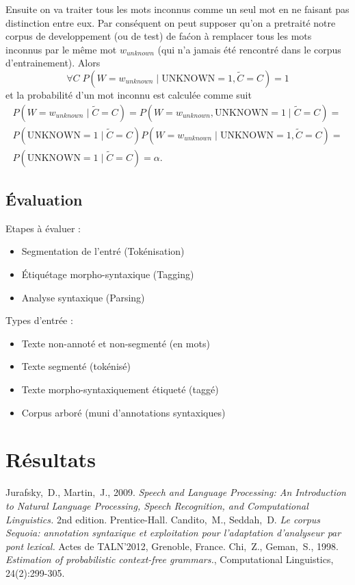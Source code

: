 \documentclass[12pt]{article}
\begin{document}
Ensuite on va traiter tous les mots inconnus comme un seul mot en ne faisant pas distinction entre eux. 
Par cons\'equent on peut supposer qu'on a pretrait\'e notre corpus de developpement (ou de test) de fa\'con \`a remplacer tous les mots inconnus par le m\^eme mot $w_{unknown}$ (qui n'a jamais \'et\'e rencontr\'e dans le corpus d'entrainement). Alors 
$$\forall C \; P(W = w_{unknown} \mid \mathrm{UNKNOWN} = 1, \tilde{C} = C) = 1$$
et la probabilit\'e d'un mot inconnu est calcul\'ee comme suit
\begin{multline}
\label{prob_mot_inconnu_1}
 P(W = w_{unknown} \mid \tilde{C} = C) = P(W = w_{unknown}, \mathrm{UNKNOWN} = 1 \mid \tilde{C} = C) =
 \\
 P(\mathrm{UNKNOWN} = 1 \mid \tilde{C} = C) P(W = w_{unknown} \mid \mathrm{UNKNOWN} = 1, \tilde{C} = C) =
 \\
 P(\mathrm{UNKNOWN} = 1 \mid \tilde{C} = C) = \alpha.
\end{multline}


\subsection{\'Evaluation}

Etapes \`a \'evaluer :
\begin{itemize}
\item Segmentation de l'entr\'e (Tok\'enisation)
\item \'Etiqu\'etage morpho-syntaxique (Tagging)
\item Analyse syntaxique (Parsing)
\end{itemize}

Types d'entr\'ee :
\begin{itemize}
\item Texte non-annot\'e et non-segment\'e (en mots)
\item Texte segment\'e (tok\'enis\'e)
\item Texte morpho-syntaxiquement \'etiquet\'e (tagg\'e)
\item Corpus arbor\'e (muni d'annotations syntaxiques)
\end{itemize}


\section{R\'esultats}




\begin{thebibliography}{9}
    Jurafsky,~D., Martin,~J., 2009. \emph{Speech and Language Processing: An Introduction to Natural Language Processing, Speech Recognition, and Computational Linguistics.} 2nd edition. Prentice-Hall.
    Candito,~M., Seddah,~D.
    \emph{Le corpus Sequoia: annotation syntaxique et exploitation pour
    l'adaptation d'analyseur par pont lexical.} Actes de TALN'2012, Grenoble,
    France.
    Chi,~Z., Geman,~S., 1998.
    \emph{Estimation of probabilistic context-free grammars.}, Computational Linguistics, 24(2):299-305.
\end{thebibliography}
\end{document}
